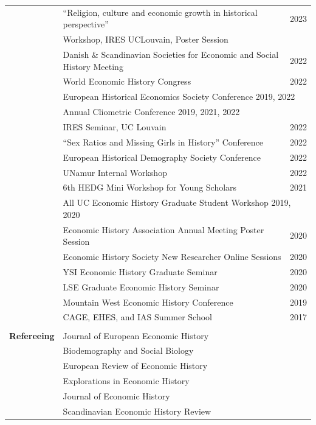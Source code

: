 \documentclass[a4paper,11pt,oneside]{article}
\begin{document}
\begin{longtable}{@{} p{0.175\linewidth} p{0.775\linewidth} p{0.05\linewidth}}
   & ``Religion, culture and economic growth in historical perspective'' &  \hfill 2023 \\ 
   & \hspace{4ex} Workshop, IRES UCLouvain, Poster Session \\
   & Danish  \& Scandinavian Societies for Economic and Social History Meeting &  \hfill 2022  \\
   & World Economic History Congress & \hfill 2022 \\
   & \multicolumn{2}{l}{  European Historical Economics Society Conference   \hfill 2019, 2022} \\
   & \multicolumn{2}{l}{ Annual Cliometric Conference    \hfill 2019, 2021, 2022} \\
   & IRES Seminar, UC Louvain & \hfill 2022 \\
   &  ``Sex Ratios and Missing Girls in History'' Conference & \hfill 2022\\
   & European Historical Demography Society Conference & \hfill 2022 \\
   & UNamur Internal Workshop & \hfill 2022 \\
   &   6th HEDG Mini Workshop for Young Scholars   & \hfill 2021\\
   & \multicolumn{2}{l}{ All UC Economic History Graduate Student Workshop  \hfill 2019, 2020}\\
   &  Economic History Association Annual Meeting Poster Session & \hfill  2020\\
   &  Economic History Society New Researcher Online Sessions & \hfill 2020\\
   &  YSI Economic History Graduate Seminar & \hfill 2020\\
   &  LSE Graduate Economic History Seminar & \hfill  2020\\
   &  Mountain West Economic History Conference  & \hfill  2019\\
   &  CAGE, EHES, and IAS Summer School  & \hfill  2017\\
   \\
   \textbf{\large{Refereeing}} & Journal of European Economic History & \\& Biodemography and Social Biology & \\
   &  European Review of Economic History &\\
    & Explorations in Economic History     &\\
    & Journal of Economic History & \\
    & Scandinavian Economic History Review  & \\
 
\end{longtable}
\end{document}
